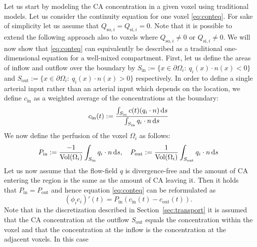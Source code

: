 \documentclass[journal,twocolumn]{IEEEtran}
\begin{document}
	Let us start by modeling the CA concentration in a given voxel using traditional models.
	Let us consider the continuity equation for one voxel \eqref{eq:conteq}.
	For sake of simplicity let us assume that $Q_{\mathrm{so},i} = Q_{\mathrm{si},i} = 0$.
	Note that it is possible to extend the following approach also to voxels where $Q_{\mathrm{so},i} \neq 0$ or $Q_{\mathrm{si},i} \neq 0$.
	We will now show that \eqref{eq:conteq} can equivalently be described as a traditional one-dimensional equation for a well-mixed compartment.
	First, let us define the areas of inflow and outflow over the boundary by $S_{\mathrm{in}} := \{ x \in \partial \Omega_i: \ q_i(x) \cdot n(x) < 0 \}$ and $S_{\mathrm{out}}:= \{ x \in \partial \Omega_i: \ q_i(x) \cdot n(x) > 0 \}$ respectively.
	In order to define a single arterial input rather than an arterial input which depends on the location, we define $c_{\mathrm{in}}$ as a weighted average of the concentrations at the boundary:
	\begin{equation}\label{eq:cin}
	 	c_{\mathrm{in}}(t):= \frac{\int_{S_{\mathrm{in}}}c(t)(q_i \cdot n) \diffint s}{\int_{S_{\mathrm{in}}} q_i \cdot n \diffint s}
	\end{equation}
	We now define the perfusion of the voxel $\Omega_i$ as follows:
	\begin{equation}\label{eq:perflocal}
		P_{\mathrm{in}} :=\frac{-1}{\mathrm{Vol}( \Omega_i)}\int_{S_{\mathrm{in}}} q_i \cdot n \diffint s, \quad P_{\mathrm{out}}:= \frac{1}{\mathrm{Vol}( \Omega_i)} \int_{S_{\mathrm{out}}} q_i \cdot n \diffint s
	\end{equation}
	Let us now assume that the flow-field $q$ is divergence-free and the amount of CA entering the region is the same as the amount of CA leaving it. 
	Then it holds that $P_{\mathrm{in}}=P_{\mathrm{out}}$ and hence equation \eqref{eq:conteq} can be reformulated as
	\begin{equation}\label{eq:singlevoxel}
		(\phi_i c_i)'(t)  = P_{\mathrm{in}} (c_\mathrm{in}(t)  - c_\mathrm{out}(t)).
	\end{equation}
	Note that in the discretization described in Section~\ref{sec:transport} it is assumed that the CA concentration at the outflow $S_\mathrm{out}$ equals the concentration within the voxel and that the concentration at the inflow is the concentration at the adjacent voxels. In this case 
\end{document}
